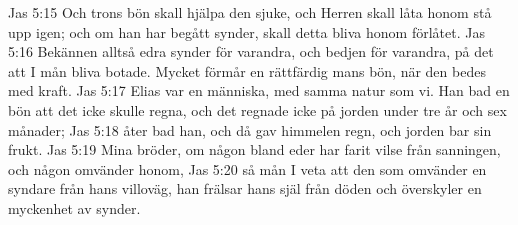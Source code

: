 Jas 5:15  Och trons bön skall hjälpa den sjuke, och Herren skall låta honom stå upp igen; och om han har begått synder, skall detta bliva honom förlåtet.
Jas 5:16  Bekännen alltså edra synder för varandra, och bedjen för varandra, på det att I mån bliva botade. Mycket förmår en rättfärdig mans bön, när den bedes med kraft.
Jas 5:17  Elias var en människa, med samma natur som vi. Han bad en bön att det icke skulle regna, och det regnade icke på jorden under tre år och sex månader;
Jas 5:18  åter bad han, och då gav himmelen regn, och jorden bar sin frukt.
Jas 5:19  Mina bröder, om någon bland eder har farit vilse från sanningen, och någon omvänder honom,
Jas 5:20  så mån I veta att den som omvänder en syndare från hans villoväg, han frälsar hans själ från döden och överskyler en myckenhet av synder.


